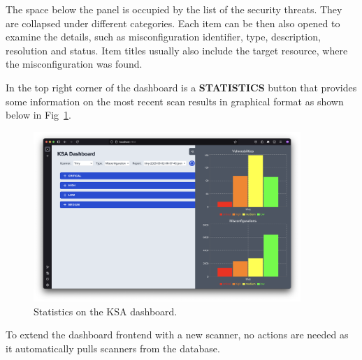 The space below the panel is occupied by the list of the security threats. They are collapsed under different categories. Each item can be then also opened to examine the details, such as misconfiguration identifier, type, description, resolution and status. Item titles usually also include the target resource, where the misconfiguration was found.

In the top right corner of the dashboard is a \textbf{STATISTICS} button that provides some information on the most recent scan results in graphical format as shown below in Fig~\ref{img:ksa-dashboard-statistics}.

\begin{figure}[!hbt]
	\begin{center}
		\includegraphics[width=0.9\textwidth]{images/ksa-dashboard-statistics.png}
        \caption{Statistics on the KSA dashboard.}
		\label{img:ksa-dashboard-statistics}
	\end{center}
\end{figure}

To extend the dashboard frontend with a new scanner, no actions are needed as it automatically pulls scanners from the database.